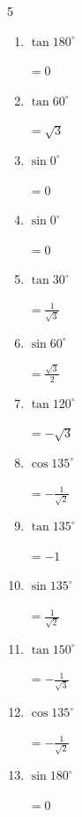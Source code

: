 \begin{multicols}{5}
\begin{enumerate}
  \item $\displaystyle \tan{180^\circ}$

        $\displaystyle =0$

  \item $\displaystyle \tan{60^\circ}$

        $\displaystyle =\sqrt{3}$

  \item $\displaystyle \sin{0^\circ}$

        $\displaystyle =0$

  \item $\displaystyle \sin{0^\circ}$

        $\displaystyle =0$

  \item $\displaystyle \tan{30^\circ}$

        $\displaystyle =\frac{1}{\sqrt{3}}$

  \item $\displaystyle \sin{60^\circ}$

        $\displaystyle =\frac{\sqrt{3}}{2}$

  \item $\displaystyle \tan{120^\circ}$

        $\displaystyle =-\sqrt{3}$

  \item $\displaystyle \cos{135^\circ}$

        $\displaystyle =-\frac{1}{\sqrt{2}}$

  \item $\displaystyle \tan{135^\circ}$

        $\displaystyle =-1$

  \item $\displaystyle \sin{135^\circ}$

        $\displaystyle =\frac{1}{\sqrt{2}}$

  \item $\displaystyle \tan{150^\circ}$

        $\displaystyle =-\frac{1}{\sqrt{3}}$

\columnbreak %

  \item $\displaystyle \cos{135^\circ}$

        $\displaystyle =-\frac{1}{\sqrt{2}}$

  \item $\displaystyle \sin{180^\circ}$

        $\displaystyle =0$


\end{enumerate}
\end{multicols}
